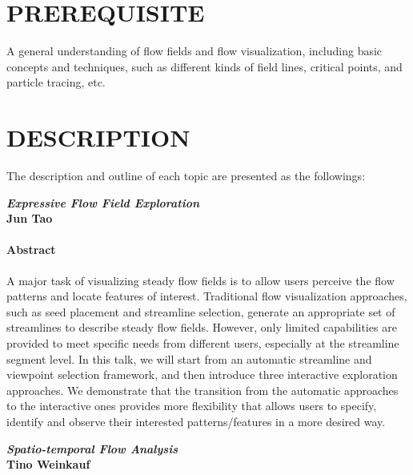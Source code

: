 \documentclass[preprint,journal]{vgtc}       %
\newcommand{\addverticalspace}{\vspace{3mm}}
\begin{document}
\section*{PREREQUISITE}
A general understanding of flow fields and flow visualization, including basic concepts and techniques, such as different kinds of field lines, critical points, and particle tracing, etc.


\section*{DESCRIPTION}
The description and outline of each topic are presented as the followings:

\addverticalspace

\noindent\textbf{\textit{Expressive Flow Field Exploration}}\\
\textbf{Jun Tao}
\paragraph{Abstract}
A major task of visualizing steady flow fields is to allow users perceive the flow patterns and locate features of interest. Traditional flow visualization approaches, such as seed placement and streamline selection, generate an appropriate set of streamlines to describe steady flow fields. However, only limited capabilities are provided to meet specific needs from different users, especially at the streamline segment level. In this talk, we will start from an automatic streamline and viewpoint selection framework, and then introduce three interactive exploration approaches. We demonstrate that the transition from the automatic approaches to the interactive ones provides more flexibility that allows users to specify, identify and observe their interested patterns/features in a more desired way.

\addverticalspace

\noindent\textbf{\textit{Spatio-temporal Flow Analysis}}\\
\textbf{Tino Weinkauf}
\end{document}
